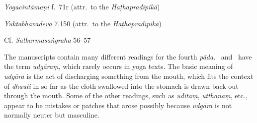 \begin{ekdosis}
\begin{testimonia}[hp02_024]
\emph{Yogacintāmaṇi} f.~71r (attr.~to the \emph{Haṭhapradīpikā})

\begin{versinnote}
\end{versinnote}

\emph{Yuktabhavadeva} 7.150 (attr.~to the \emph{Haṭhapradīpikā})

\begin{versinnote}
\end{versinnote}

Cf. \emph{Satkarmasaṅgraha} 56–57

\begin{versinnote}
\end{versinnote}

\end{testimonia}

\begin{philcomm}[hp02_024]
The manuscripts contain many different readings for the fourth \emph{pāda}. \alphaThree\ and \etaOne\ have the term \emph{udgāraṃ}, which rarely occurs in yoga texts. The basic meaning of \emph{udgāra} is the act of discharging something from the mouth, which fits the context of \emph{dhauti} in so far as the cloth swallowed into the stomach is drawn back out through the mouth. Some of the other readings, such as \emph{uditaṃ}, \emph{utthānaṃ}, etc., appear to be mistakes or patches that arose possibly because \emph{udgāra} is not normally neuter but masculine. \lb


\end{philcomm}
\end{ekdosis}
